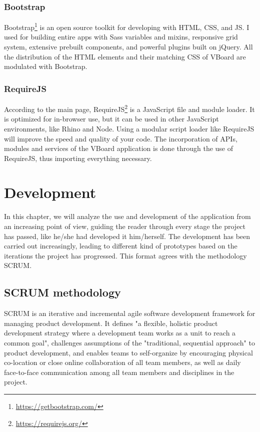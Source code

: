 \documentclass[a4paper, 12pt]{book}
\begin{document}
\subsection{Bootstrap}
Bootstrap\footnote{\url{https://getbootstrap.com/}} is an open source toolkit for developing with HTML, CSS, and JS. I used for building entire apps with Sass variables and mixins, responsive grid system, extensive prebuilt components, and powerful plugins built on jQuery. All the distribution of the HTML elements and their matching CSS of VBoard are modulated with Bootstrap.

\subsection{RequireJS}
According to the main page, RequireJS\footnote{\url{https://requirejs.org/}} is a JavaScript file and module loader. It is optimized for in-browser use, but it can be used in other JavaScript environments, like Rhino and Node. Using a modular script loader like RequireJS will improve the speed and quality of your code. The incorporation of APIs, modules and services of the VBoard application is done through the use of RequireJS, thus importing everything necessary.




\chapter{Development}

In this chapter, we will analyze the use and development of the application from an increasing point of view, guiding the reader through every stage the project has passed, like he/she had developed it him/herself. The development has been carried out increasingly, leading to different kind of prototypes based on the iterations the project has progressed. This format agrees with the methodology SCRUM.

\section{SCRUM methodology}
SCRUM is an iterative and incremental agile software development framework for managing product development. It defines "a flexible, holistic product development strategy where a development team works as a unit to reach a common goal", challenges assumptions of the "traditional, sequential approach" to product development, and enables teams to self-organize by encouraging physical co-location or close online collaboration of all team members, as well as daily face-to-face communication among all team members and disciplines in the project.
\end{document}
